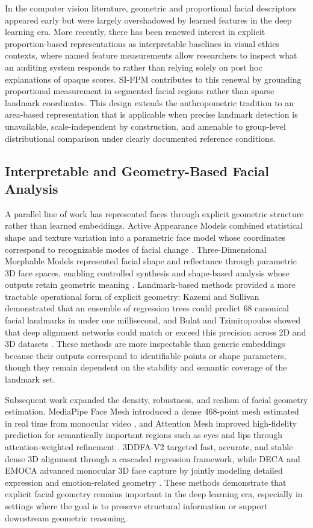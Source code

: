 \documentclass{article}
\begin{document}
In the computer vision literature, geometric and proportional facial descriptors appeared early but were largely overshadowed by learned features in the deep learning era. More recently, there has been renewed interest in explicit proportion-based representations as interpretable baselines in visual ethics contexts, where named feature measurements allow researchers to inspect what an auditing system responds to rather than relying solely on post hoc explanations of opaque scores. SI-FPM contributes to this renewal by grounding proportional measurement in segmented facial regions rather than sparse landmark coordinates. This design extends the anthropometric tradition to an area-based representation that is applicable when precise landmark detection is unavailable, scale-independent by construction, and amenable to group-level distributional comparison under clearly documented reference conditions.

\subsection{Interpretable and Geometry-Based Facial Analysis}

A parallel line of work has represented faces through explicit geometric structure rather than learned embeddings. Active Appearance Models combined statistical shape and texture variation into a parametric face model whose coordinates correspond to recognizable modes of facial change \cite{cootes2001aam}. Three-Dimensional Morphable Models represented facial shape and reflectance through parametric 3D face spaces, enabling controlled synthesis and shape-based analysis whose outputs retain geometric meaning \cite{blanz1999morphable}. Landmark-based methods provided a more tractable operational form of explicit geometry: Kazemi and Sullivan demonstrated that an ensemble of regression trees could predict 68 canonical facial landmarks in under one millisecond, and Bulat and Tzimiropoulos showed that deep alignment networks could match or exceed this precision across 2D and 3D datasets \cite{kazemi2014facealignment,bulat2017facealignment}. These methods are more inspectable than generic embeddings because their outputs correspond to identifiable points or shape parameters, though they remain dependent on the stability and semantic coverage of the landmark set.

Subsequent work expanded the density, robustness, and realism of facial geometry estimation. MediaPipe Face Mesh introduced a dense 468-point mesh estimated in real time from monocular video \cite{kartynnik2019facemesh}, and Attention Mesh improved high-fidelity prediction for semantically important regions such as eyes and lips through attention-weighted refinement \cite{grishchenko2020attentionmesh}. 3DDFA-V2 targeted fast, accurate, and stable dense 3D alignment through a cascaded regression framework, while DECA and EMOCA advanced monocular 3D face capture by jointly modeling detailed expression and emotion-related geometry \cite{guo2020threeddfa,feng2021deca,danecek2022emoca}. These methods demonstrate that explicit facial geometry remains important in the deep learning era, especially in settings where the goal is to preserve structural information or support downstream geometric reasoning.
\end{document}
